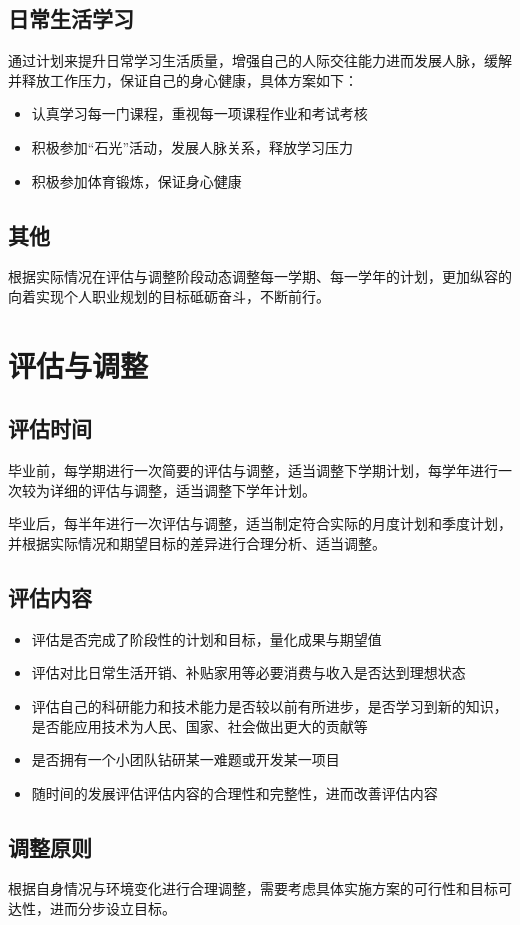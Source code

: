 \documentclass{article}
\begin{document}
\subsection{日常生活学习}

通过计划来提升日常学习生活质量，增强自己的人际交往能力进而发展人脉，缓解并释放工作压力，保证自己的身心健康，具体方案如下：

\begin{itemize}
    \item 认真学习每一门课程，重视每一项课程作业和考试考核
    \item 积极参加“石光”活动，发展人脉关系，释放学习压力
    \item 积极参加体育锻炼，保证身心健康
\end{itemize}

\subsection{其他}

根据实际情况在评估与调整阶段动态调整每一学期、每一学年的计划，更加纵容的向着实现个人职业规划的目标砥砺奋斗，不断前行。

\section{评估与调整}

\subsection{评估时间}

毕业前，每学期进行一次简要的评估与调整，适当调整下学期计划，每学年进行一次较为详细的评估与调整，适当调整下学年计划。

毕业后，每半年进行一次评估与调整，适当制定符合实际的月度计划和季度计划，并根据实际情况和期望目标的差异进行合理分析、适当调整。

\subsection{评估内容}

\begin{itemize}
    \item 评估是否完成了阶段性的计划和目标，量化成果与期望值
    \item 评估对比日常生活开销、补贴家用等必要消费与收入是否达到理想状态
    \item 评估自己的科研能力和技术能力是否较以前有所进步，是否学习到新的知识，是否能应用技术为人民、国家、社会做出更大的贡献等
    \item 是否拥有一个小团队钻研某一难题或开发某一项目
    \item 随时间的发展评估评估内容的合理性和完整性，进而改善评估内容
\end{itemize}

\subsection{调整原则}

根据自身情况与环境变化进行合理调整，需要考虑具体实施方案的可行性和目标可达性，进而分步设立目标。
\end{document}
